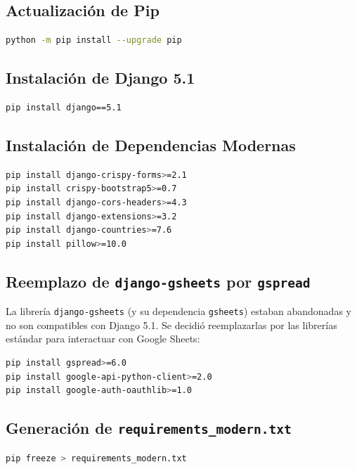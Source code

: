 \documentclass[12pt, spanish]{article}
\begin{document}
\subsection{Actualización de Pip}
\begin{lstlisting}[language=bash, caption={Actualización de pip}]
python -m pip install --upgrade pip
\end{lstlisting}

\subsection{Instalación de Django 5.1}
\begin{lstlisting}[language=bash, caption={Instalación de Django 5.1}]
pip install django==5.1
\end{lstlisting}

\subsection{Instalación de Dependencias Modernas}
\begin{lstlisting}[language=bash, caption={Instalación de dependencias actualizadas}]
pip install django-crispy-forms>=2.1
pip install crispy-bootstrap5>=0.7
pip install django-cors-headers>=4.3
pip install django-extensions>=3.2
pip install django-countries>=7.6
pip install pillow>=10.0
\end{lstlisting}

\subsection{Reemplazo de \texttt{django-gsheets} por \texttt{gspread}}
La librería \texttt{django-gsheets} (y su dependencia \texttt{gsheets}) estaban abandonadas y no son compatibles con Django 5.1. Se decidió reemplazarlas por las librerías estándar para interactuar con Google Sheets:

\begin{lstlisting}[language=bash, caption={Instalación de nuevas librerías para Google Sheets}]
pip install gspread>=6.0
pip install google-api-python-client>=2.0
pip install google-auth-oauthlib>=1.0
\end{lstlisting}

\subsection{Generación de \texttt{requirements\_modern.txt}}
\begin{lstlisting}[language=bash, caption={Exportación de dependencias}]
pip freeze > requirements_modern.txt
\end{lstlisting}
\end{document}

